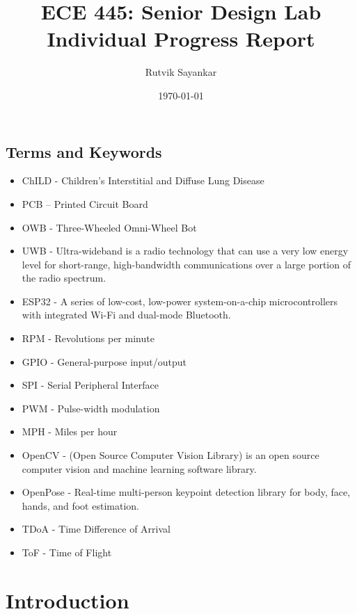 \documentclass{report}
\title{ECE 445: Senior Design Lab \\ Individual Progress Report} %
\author{Rutvik Sayankar} %
\date{\today} %
\begin{document}
    \maketitle %
    
    \pagebreak
    \tableofcontents %
    \pagebreak

    \section{Terms and Keywords}
    \vspace{0.8cm}
    \begin{itemize}
        \item ChILD - Children's Interstitial and Diffuse Lung Disease
        \item PCB – Printed Circuit Board
        \item OWB - Three-Wheeled Omni-Wheel Bot
        \item UWB - Ultra-wideband is a radio technology that can use a very low energy level for short-range, high-bandwidth communications over a large portion of the radio spectrum.
        \item ESP32 - A series of low-cost, low-power system-on-a-chip microcontrollers with integrated Wi-Fi and dual-mode Bluetooth.
        \item RPM - Revolutions per minute
        \item GPIO - General-purpose input/output
        \item SPI - Serial Peripheral Interface
        \item PWM - Pulse-width modulation
        \item MPH - Miles per hour
        \item OpenCV - (Open Source Computer Vision Library) is an open source computer vision and machine learning software library.
        \item OpenPose - Real-time multi-person keypoint detection library for body, face, hands, and foot estimation.
        \item TDoA - Time Difference of Arrival 
        \item ToF - Time of Flight
    \end{itemize}

    \pagebreak

    \chapter{Introduction}
\end{document}

